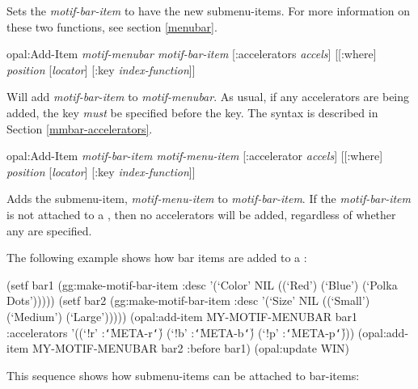 
Sets the {\it motif-bar-item} to have the new submenu-items.  For more
information on these two functions, see section \ref{menubar}.

\begin{programexample}
opal:Add-Item {\it motif-menubar motif-bar-item} [:accelerators {\it accels}] \value{method}
              {\it                                                  } [[:where] {\it position} [{\it locator}] [:key {\it index-function}]]
\end{programexample}

Will add {\it motif-bar-item} to {\it motif-menubar}.  As usual, if any
accelerators are being added, the  key {\it must} be
specified before the  key.  The  syntax is
described in Section \ref{mmbar-accelerators}.

\begin{programexample}
opal:Add-Item {\it motif-bar-item motif-menu-item} \value{method}
              [:accelerator {\it accels}]
              [[:where] {\it position} [{\it locator}] [:key {\it index-function}]]
\end{programexample}

Adds the submenu-item, {\it motif-menu-item} to {\it motif-bar-item}.  If the
{\it motif-bar-item} is not attached to a , then no
accelerators will be added, regardless of whether any are specified.

The following example shows how bar items are added to a :

\begin{programexample}
(setf bar1 (gg:make-motif-bar-item
            :desc '(`Color' NIL ((`Red') (`Blue') (`Polka Dots')))))	
(setf bar2 (gg:make-motif-bar-item
            :desc '(`Size' NIL ((`Small') (`Medium') (`Large')))))
(opal:add-item MY-MOTIF-MENUBAR bar1
               :accelerators '((`!r' :{\tt\char`\|}META-r{\tt\char`\|}) (`!b' :{\tt\char`\|}META-b{\tt\char`\|}) (`!p' :{\tt\char`\|}META-p{\tt\char`\|})))
(opal:add-item MY-MOTIF-MENUBAR bar2 :before bar1)	
(opal:update WIN)
\end{programexample}

This sequence shows how submenu-items can be attached to bar-items:

